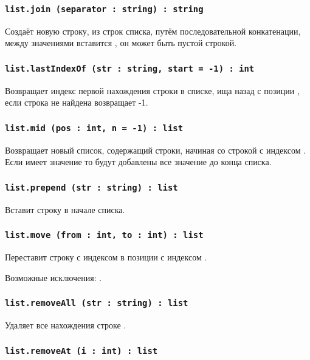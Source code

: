 \subsubsection{\lstinline|list.join (separator : string) : string|}

Создаёт новую строку, из строк списка, путём последовательной конкатенации, между значениями вставится , он может быть пустой строкой.

\subsubsection{\lstinline|list.lastIndexOf (str : string, start = -1) : int|}

Возвращает индекс первой нахождения строки  в списке, ища назад с позиции , если строка не найдена возвращает -1.

\subsubsection{\lstinline|list.mid (pos : int, n = -1) : list|}

Возвращает новый список, содержащий  строки, начиная со строкой с индексом . Если  имеет значение  то будут добавлены все значение до конца списка.

\subsubsection{\lstinline|list.prepend (str : string) : list|}

Вставит строку  в начале списка.

\subsubsection{\lstinline|list.move (from : int, to : int) : list|}

Переставит строку с индексом  в позиции с индексом .

Возможные исключения: .

\subsubsection{\lstinline|list.removeAll (str : string) : list|}

Удаляет все нахождения строке .

\subsubsection{\lstinline|list.removeAt (i : int) : list|}

